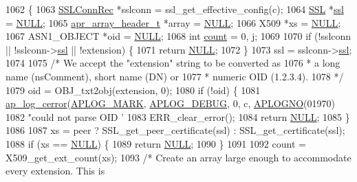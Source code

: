 \begin{DoxyCode}
1062 \{
1063     \hyperlink{structSSLConnRec}{SSLConnRec} *sslconn = ssl\_get\_effective\_config(c);
1064     \hyperlink{group__MOD__SSL_gac05889312301718b3fc106564942ad68}{SSL} *\hyperlink{group__MOD__SSL_ga91d808d6c1c01029f9c9260b9b69a437}{ssl} = \hyperlink{pcre_8txt_ad7f989d16aa8ca809a36bc392c07fba1}{NULL};
1065     \hyperlink{structapr__array__header__t}{apr\_array\_header\_t} *array = \hyperlink{pcre_8txt_ad7f989d16aa8ca809a36bc392c07fba1}{NULL};
1066     X509 *xs = \hyperlink{pcre_8txt_ad7f989d16aa8ca809a36bc392c07fba1}{NULL};
1067     ASN1\_OBJECT *oid = \hyperlink{pcre_8txt_ad7f989d16aa8ca809a36bc392c07fba1}{NULL};
1068     \textcolor{keywordtype}{int} \hyperlink{group__APR__MD5_ga16ff2d8e15ade4948398b0aeb80124a8}{count} = 0, j;
1069 
1070     \textcolor{keywordflow}{if} (!sslconn || !sslconn->\hyperlink{structSSLConnRec_acc0257b6ed74d7c6aee8f1a3447df6b5}{ssl} || !extension) \{
1071         \textcolor{keywordflow}{return} \hyperlink{pcre_8txt_ad7f989d16aa8ca809a36bc392c07fba1}{NULL};
1072     \}
1073     ssl = sslconn->\hyperlink{structSSLConnRec_acc0257b6ed74d7c6aee8f1a3447df6b5}{ssl};
1074 
1075     \textcolor{comment}{/* We accept the "extension" string to be converted as}
1076 \textcolor{comment}{     * a long name (nsComment), short name (DN) or}
1077 \textcolor{comment}{     * numeric OID (1.2.3.4).}
1078 \textcolor{comment}{     */}
1079     oid = OBJ\_txt2obj(extension, 0);
1080     \textcolor{keywordflow}{if} (!oid) \{
1081         \hyperlink{group__APACHE__CORE__LOG_ga60ef6919b8e1b691b0c1ac4d67c9449f}{ap\_log\_cerror}(\hyperlink{group__APACHE__CORE__LOG_ga655e126996849bcb82e4e5a14c616f4a}{APLOG\_MARK}, \hyperlink{group__APACHE__CORE__LOG_gadfcef90537539cf2b7d35cfbbbafeb93}{APLOG\_DEBUG}, 0, c, 
      \hyperlink{group__APACHE__CORE__LOG_ga1dee8a07e06bc5b3de8b89662c2cd666}{APLOGNO}(01970)
1082                       \textcolor{stringliteral}{"could not parse OID '%
1083         ERR\_clear\_error();
1084         \textcolor{keywordflow}{return} \hyperlink{pcre_8txt_ad7f989d16aa8ca809a36bc392c07fba1}{NULL};
1085     \}
1086 
1087     xs = peer ? SSL\_get\_peer\_certificate(ssl) : SSL\_get\_certificate(ssl);
1088     \textcolor{keywordflow}{if} (xs == \hyperlink{pcre_8txt_ad7f989d16aa8ca809a36bc392c07fba1}{NULL}) \{
1089         \textcolor{keywordflow}{return} \hyperlink{pcre_8txt_ad7f989d16aa8ca809a36bc392c07fba1}{NULL};
1090     \}
1091 
1092     count = X509\_get\_ext\_count(xs);
1093     \textcolor{comment}{/* Create an array large enough to accommodate every extension. This is}
}
\end{DoxyCode}
